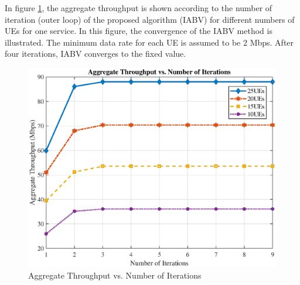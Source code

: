 \documentclass[conference]{IEEEtran}
\begin{document}

In figure \ref{fig:11}, the aggregate throughput is shown according to the number of iteration (outer loop) of the
proposed algorithm (IABV) for different numbers of UEs for one service. In this figure, the convergence of the IABV method is illustrated. The minimum data rate for each UE is assumed to be 2 Mbps.
After four iterations, IABV converges to the fixed value.



\begin{figure}
  \centering 
    \includegraphics[scale = 0.4]{iter.eps}
  \caption{Aggregate Throughput vs. Number of Iterations}
  \label{fig:11}
\end{figure}
\end{document}
